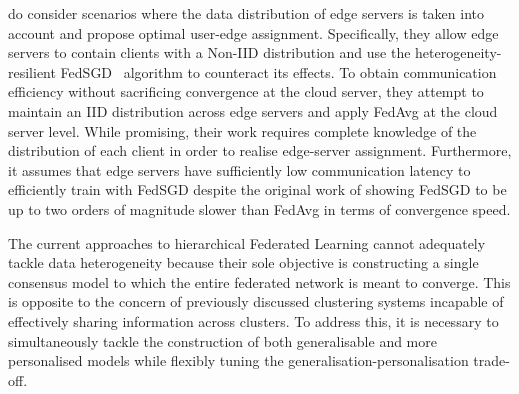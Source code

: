 \citet{OptimalUserEdgeAssingmentHierFL} do consider scenarios where the data distribution of edge servers is taken into account and propose optimal user-edge assignment. Specifically, they allow edge servers to contain clients with a Non-IID distribution and use the heterogeneity-resilient FedSGD~\citep{FedAvg} algorithm to counteract its effects. To obtain communication efficiency without sacrificing convergence at the cloud server, they attempt to maintain an IID distribution across edge servers and apply FedAvg at the cloud server level. While promising, their work requires complete knowledge of the distribution of each client in order to realise edge-server assignment. Furthermore, it assumes that edge servers have sufficiently low communication latency to efficiently train with FedSGD despite the original work of \citet{FedAvg} showing FedSGD to be up to two orders of magnitude slower than FedAvg in terms of convergence speed.

The current approaches to hierarchical Federated Learning cannot adequately tackle data heterogeneity because their sole objective is constructing a single consensus model to which the entire federated network is meant to converge. This is opposite to the concern of previously discussed clustering systems incapable of effectively sharing information across clusters. To address this, it is necessary to simultaneously tackle the construction of both generalisable and more personalised models while flexibly tuning the generalisation-personalisation trade-off.




